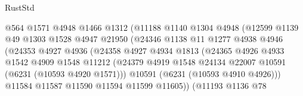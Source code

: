 \begin{lexlean}{RustStd}
\begin{coremodule}
{{                                  @564
                                  @1571
                                  @4948
                                  @1466
                                  @1312
                                  (@11188
                                    @1140
                                    @1304
                                    @4948
                                    (@12599
                                      @1139
                                      @49
                                      @1303
                                      @1528
                                      @4947
                                      @21950
                                      (@24346
                                        @1138
                                        @11
                                        @1277
                                        @4938
                                        @4946
                                        (@24353
                                          @4927
                                          @4936
                                          (@24358
                                            @4927
                                            @4934
                                            @1813
                                            (@24365
                                              @4926
                                              @4933
                                              @1542
                                              @4909
                                              @1548
                                              @11212
                                              (@24379
                                                @4919
                                                @1548
                                                @24134
                                                @22007
                                                @10591
                                                (@6231 (@10593 @4920 @1571)))
                                              @10591
                                              (@6231 (@10593 @4910 @4926)))
                                            @11584
                                            @11587
                                            @11590
                                            @11594
                                            @11599
                                            @11605))
                                        (@11193
                                          @1136
                                          @78
}}
\end{coremodule}
\end{lexlean}
